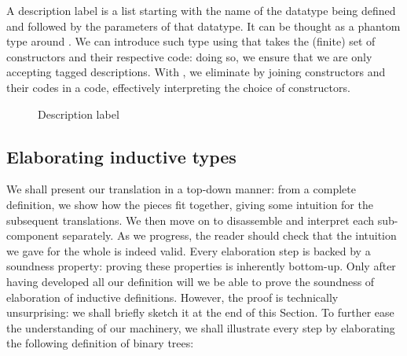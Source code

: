 \documentclass{scrartcl}
\theoremstyle{plain}
\theoremstyle{definition}
\begin{document}
A description label  is a list starting with the name
of the datatype being defined and followed by the parameters of that
datatype. It can be thought as a phantom type around . We can
introduce such type using  that takes the (finite) set
of constructors and their respective code: doing so, we ensure that we
are only accepting tagged descriptions. With , we
eliminate  by joining constructors and their codes
in a  code, effectively interpreting the choice of
constructors.


\begin{figure}[bt]



\caption{Description label}
\label{fig:desc-label}

\end{figure}



\subsection{Elaborating inductive types}




\newcommand{\TreeLeaf}{\Constructor{leaf}}


We shall present our translation in a top-down manner: from a complete
definition, we show how the pieces fit together, giving some intuition
for the subsequent translations. We then move on to disassemble and
interpret each sub-component separately. As we progress, the reader
should check that the intuition we gave for the whole is indeed
valid. Every elaboration step is backed by a soundness property:
proving these properties is inherently bottom-up. Only after having
developed all our definition will we be able to prove the soundness of
elaboration of inductive definitions. However, the proof is
technically unsurprising: we shall briefly sketch it at the end of
this Section.  To further ease the understanding of our machinery, we
shall illustrate every step by elaborating the following definition of
binary trees:
\end{document}
